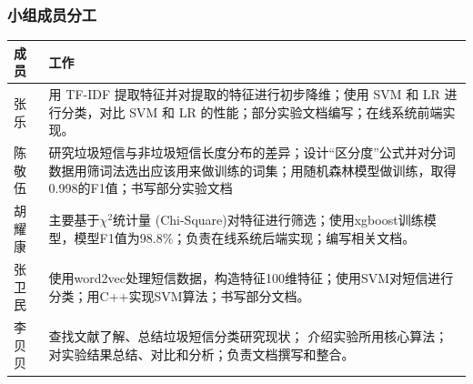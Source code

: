 \subsubsection{小组成员分工}\label{ux5c0fux7ec4ux6210ux5458ux5206ux5de5}

\begin{longtable}[]{@{}ll@{}}
\toprule
\begin{minipage}[b]{0.07\columnwidth}\raggedright\strut
成员
\strut\end{minipage} &
\begin{minipage}[b]{0.42\columnwidth}\raggedright\strut
工作
\strut\end{minipage}\tabularnewline
\midrule
\endhead
\begin{minipage}[t]{0.07\columnwidth}\raggedright\strut
张乐
\strut\end{minipage} &
\begin{minipage}[t]{0.42\columnwidth}\raggedright\strut
用 TF-IDF 提取特征并对提取的特征进行初步降维；使用 SVM 和 LR
进行分类，对比 SVM 和 LR 的性能；部分实验文档编写；在线系统前端实现。
\strut\end{minipage}\tabularnewline
\begin{minipage}[t]{0.07\columnwidth}\raggedright\strut
陈敬伍
\strut\end{minipage} &
\begin{minipage}[t]{0.42\columnwidth}\raggedright\strut
研究垃圾短信与非垃圾短信长度分布的差异；设计``区分度''公式并对分词数据用筛词法选出应该用来做训练的词集；用随机森林模型做训练，取得0.998的F1值；书写部分实验文档
\strut\end{minipage}\tabularnewline
\begin{minipage}[t]{0.07\columnwidth}\raggedright\strut
胡耀康
\strut\end{minipage} &
\begin{minipage}[t]{0.42\columnwidth}\raggedright\strut
主要基于\(\chi^2\)统计量
(Chi-Square)对特征进行筛选；使用xgboost训练模型，模型F1值为98.8\%；负责在线系统后端实现；编写相关文档。
\strut\end{minipage}\tabularnewline
\begin{minipage}[t]{0.07\columnwidth}\raggedright\strut
张卫民
\strut\end{minipage} &
\begin{minipage}[t]{0.42\columnwidth}\raggedright\strut
使用word2vec处理短信数据，构造特征100维特征；使用SVM对短信进行分类；用C++实现SVM算法；书写部分文档。
\strut\end{minipage}\tabularnewline
\begin{minipage}[t]{0.07\columnwidth}\raggedright\strut
李贝贝
\strut\end{minipage} &
\begin{minipage}[t]{0.42\columnwidth}\raggedright\strut
查找文献了解、总结垃圾短信分类研究现状；
介绍实验所用核心算法；对实验结果总结、对比和分析；负责文档撰写和整合。
\strut\end{minipage}\tabularnewline
\bottomrule
\end{longtable}

